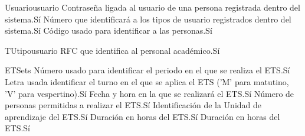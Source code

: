 \begin{cdtEntidad}{Usuario}{usuario}
	{Contraseña ligada al usuario de una persona registrada dentro del sistema.}{Sí}
	{Número que identificará a los tipos de usuario registrados dentro del sistema.}{Sí}
	{Código usado para identificar a las personas.}{Sí}
\end{cdtEntidad}
\begin{cdtEntidad}{TU}{tipousuario}
	{RFC que identifica al personal académico.}{Sí}
\end{cdtEntidad}
\begin{cdtEntidad}{ETS}{ets}
	{Número usado para identificar el periodo en el que se realiza el ETS.}{Sí}
	{Letra usada identificar el turno en el que se aplica el ETS ('M' para matutino, 'V' para vespertino).}{Sí}
	{Fecha y hora en la que se realizará el ETS.}{Sí}
	{Número de personas permitidas a realizar el ETS.}{Sí}
	{Identificación de la Unidad de aprendizaje del ETS.}{Sí}
	{Duración en horas del ETS.}{Sí}
	{Duración en horas del ETS.}{Sí}
\end{cdtEntidad}
